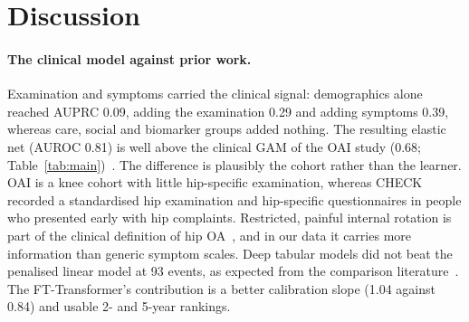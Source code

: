 \section{Discussion}
\label{sec:discussion}

\paragraph{The clinical model against prior work.}
Examination and symptoms carried the clinical signal: demographics alone reached AUPRC 0.09, adding the examination 0.29
and adding symptoms 0.39, whereas care, social and biomarker groups added nothing. The resulting elastic net (AUROC 0.81)
is well above the clinical GAM of the OAI study (0.68; Table~\ref{tab:main})~\cite{jang2023}. The difference is
plausibly the cohort rather than the learner. OAI is a knee cohort with little hip-specific examination, whereas CHECK
recorded a standardised hip examination and hip-specific questionnaires in people who presented early with hip
complaints. Restricted, painful internal rotation is part of the clinical definition of hip OA~\cite{altman1991acr}, and
in our data it carries more information than generic symptom scales. Deep tabular models did not beat the penalised
linear model at 93 events, as expected from the comparison literature~\cite{christodoulou2019}. The FT-Transformer's
contribution is a better calibration slope (1.04 against 0.84) and usable 2- and 5-year rankings.

